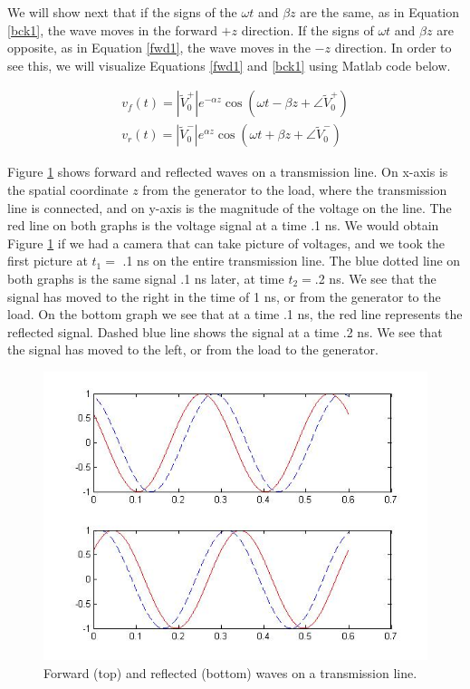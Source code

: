 \documentclass{ximera}
\begin{document}
We will show next that if  the signs of the $\omega t$ and
$\beta z$ are the same, as in Equation \ref{bck1}, the wave moves in the forward $+z$
direction. If the signs of $\omega t$ and $\beta z$ are opposite, as in Equation \ref{fwd1}, the
wave moves in the $-z$ direction. In order to see this, we will visualize Equations \ref{fwd1} and \ref{bck1} using Matlab code below.

\begin{eqnarray}
v_f(t)=|\tilde{V}_0^+| e^{ - \alpha z} \cos(\omega t - \beta z + \angle \tilde{V}_0^+) \label{fwd1} \\
v_r(t)= |\tilde{V}_0^-|e^{\alpha z} \cos(\omega t + \beta z + \angle \tilde{V}_0^-) \label{bck1}
\end{eqnarray}


Figure \ref{fwrdref}  shows forward and reflected waves on a transmission line. On x-axis is the spatial coordinate $z$ from the generator to the load, where the transmission line is connected,  and on y-axis is   the magnitude of the voltage on the line.   The red line on both graphs is the voltage signal at a time  .1 ns. We would obtain  Figure \ref{fwrdref} if we had a camera that can take picture of voltages, and we took the first picture at $t_1=$ .1 ns on the entire transmission line.  The blue dotted line on both graphs is the same signal .1 ns later,  at time $t_2=$.2  ns.  We see that the signal has moved to the right in the time of 1 ns, or from the generator to the load.  On the bottom graph we see that at a time .1 ns, the red line represents the  reflected signal.  Dashed blue line shows the signal  at a time .2 ns. We see  that  the signal has moved to the left, or  from the load to the generator. 


\begin{figure}[ht!]
\begin{center}
\includegraphics[scale=0.5]{../jpg/frwrdwave_01.jpg}
\caption{\label{fwrdref} Forward (top) and reflected (bottom) waves on a transmission line.}
\end{center}
\end{figure}
\end{document}
